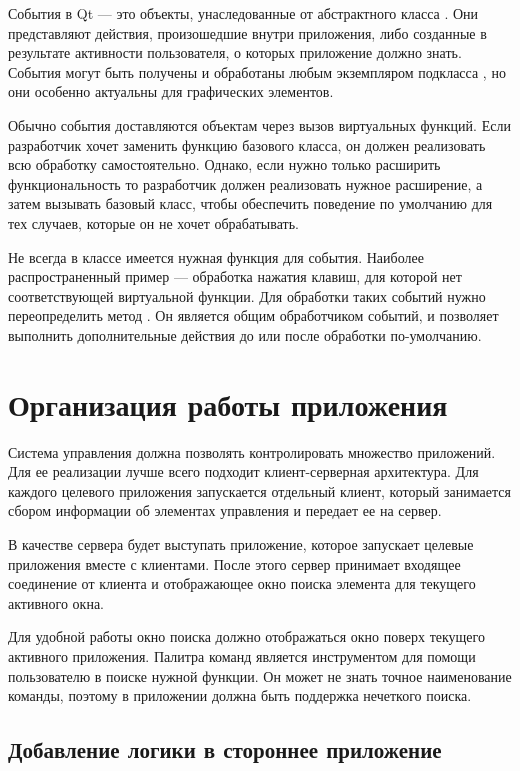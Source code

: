События в Qt — это объекты, унаследованные от абстрактного класса .
Они представляют действия, произошедшие внутри приложения, либо созданные в
результате активности пользователя, о которых приложение должно знать. События
могут быть получены и обработаны любым экземпляром подкласса , но
они особенно актуальны для графических элементов.

Обычно события доставляются объектам через вызов виртуальных функций. Если
разработчик хочет заменить функцию базового класса, он должен реализовать
всю обработку самостоятельно. Однако, если нужно только расширить
функциональность то разработчик должен реализовать нужное расширение, а затем
вызывать базовый класс, чтобы обеспечить поведение по умолчанию для тех случаев,
которые он не хочет обрабатывать.

Не всегда в классе имеется нужная функция для события. Наиболее распространенный
пример — обработка нажатия клавиш, для которой нет соответствующей виртуальной
функции. Для обработки таких событий нужно переопределить метод
. Он является общим обработчиком событий, и позволяет
выполнить дополнительные действия до или после обработки по-умолчанию.

\section{Организация работы приложения}

Система управления должна позволять контролировать множество приложений. Для ее
реализации лучше всего подходит клиент-серверная архитектура. Для каждого
целевого приложения запускается отдельный клиент, который занимается сбором
информации об элементах управления и передает ее на сервер.

В качестве сервера будет выступать приложение, которое запускает целевые
приложения вместе с клиентами. После этого сервер принимает входящее соединение
от клиента и отображающее окно поиска элемента для текущего активного окна.

Для удобной работы окно поиска должно отображаться окно поверх текущего
активного приложения. Палитра команд является инструментом для помощи
пользователю в поиске нужной функции. Он может не знать точное наименование
команды, поэтому в приложении должна быть поддержка нечеткого поиска.

\subsection{Добавление логики в стороннее приложение}

